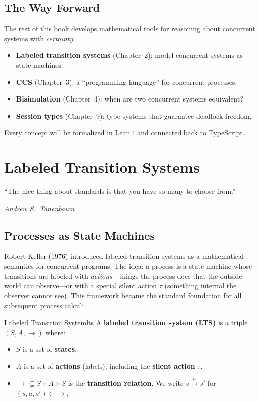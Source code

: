 \documentclass[11pt, a4paper, oneside]{book}
\begin{document}
\section{The Way Forward}

The rest of this book develops mathematical tools for reasoning about
concurrent systems with \emph{certainty}:
\begin{itemize}[nosep]
\item \textbf{Labeled transition systems} (Chapter~2): model concurrent
  systems as state machines.
\item \textbf{CCS} (Chapter~3): a ``programming language'' for concurrent
  processes.
\item \textbf{Bisimulation} (Chapter~4): when are two concurrent systems
  equivalent?
\item \textbf{Session types} (Chapter~9): type systems that guarantee
  deadlock freedom.
\end{itemize}

Every concept will be formalized in Lean\,4 and connected back to
TypeScript.

\chapter{Labeled Transition Systems}

\epigraph{``The nice thing about standards is that you have so many to choose
from.''}{\textit{Andrew S.\ Tanenbaum}}

\section{Processes as State Machines}

\begin{historical}[title={Keller and the LTS}]
Robert Keller (1976) introduced labeled transition systems as a mathematical
semantics for concurrent programs. The idea: a process is a state machine
whose transitions are labeled with \emph{actions}---things the process does
that the outside world can observe---or with a special silent action $\tau$
(something internal the observer cannot see). This framework became the
standard foundation for all subsequent process calculi.
\end{historical}

\begin{defn}{Labeled Transition System}{lts}
A \textbf{labeled transition system (LTS)} is a triple $(S, A, \to)$ where:
\begin{itemize}[nosep]
\item $S$ is a set of \textbf{states}.
\item $A$ is a set of \textbf{actions} (labels), including the
  \textbf{silent action} $\tau$.
\item ${\to} \subseteq S \times A \times S$ is the \textbf{transition
  relation}. We write $s \xrightarrow{a} s'$ for $(s, a, s') \in {\to}$.
\end{itemize}
\end{defn}
\end{document}

